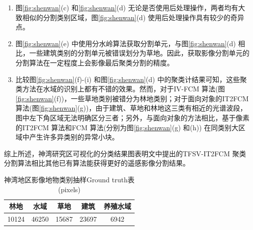 \begin{enumerate}[(1)]
    \item 图\ref{fig:shenwan}(c) 和\ref{fig:shenwan}(d) 无论是否使用后处理操作，两者均有大致相似的分割类别区域，图\ref{fig:shenwan}(d) 使用后处理操作具有较少的奇异点。
    \item 图\ref{fig:shenwan}(e) 中使用分水岭算法获取分割单元，与图\ref{fig:shenwan}(d) 相比，一些建筑类别的分割单元被错误划分为草地。因此，获取影像分割单元的分割算法在一定程度上会影像最后聚类分割的精度。
    \item 比较图\ref{fig:shenwan}(f)-(i) 和图\ref{fig:shenwan}(d) 中的聚类计结果可知，这些聚类方法在水域的识别上都有不错的效果。然而，对于IV-FCM 算法(图\ref{fig:shenwan}(f))，一些草地类别被错分为林地类别；对于面向对象的IT2FCM 算法(图\ref{fig:shenwan}(g))，由于建筑、草地和林地这三类有相近的光谱波段，图中左下角区域无法明确区分三者；另外，与面向对象的方法相比，基于像素的IT2FCM 算法和FCM 算法(分别为图\ref{fig:shenwan}(g) 和(h)) 在同类别大区域中产生许多异类别的异常小块。
\end{enumerate}
综上所述，神湾研究区可视化的分类结果图表明文中提出的TFSV-IT2FCM 聚类分割算法相比其他已有算法能获得更好的遥感影像分割结果。

\begin{table}[htb]
    \caption{神湾地区影像地物类别抽样Ground truth表(pixels)}\label{tab:shenwan_data}
    \centering
    \footnotesize
    \begin{tabular}{ccccc}
        \toprule
        林地  & 水域  & 草地  & 建筑  & 养殖水域 \\
        \midrule
        10124 & 46250 & 15687 & 23697 & 6942     \\
        \bottomrule
    \end{tabular}
\end{table}

